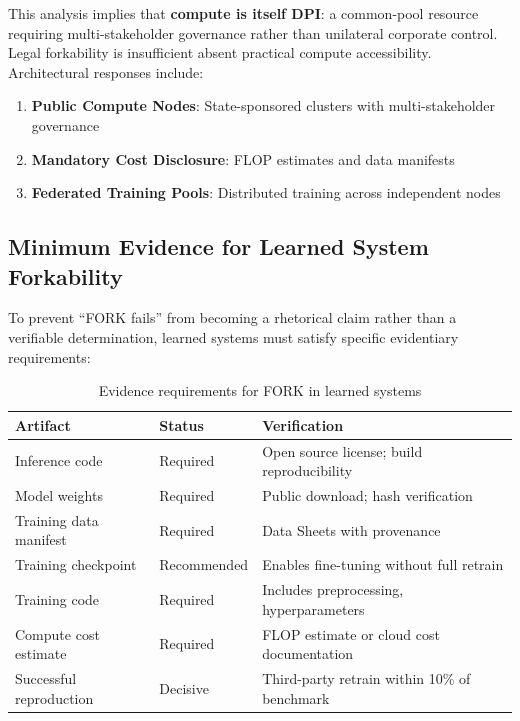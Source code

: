 \documentclass[11pt,a4paper]{article}
\theoremstyle{definition}
\begin{document}
This analysis implies that \textbf{compute is itself DPI}: a common-pool resource requiring multi-stakeholder governance rather than unilateral corporate control. Legal forkability is insufficient absent practical compute accessibility. Architectural responses include:
\begin{enumerate}[noitemsep]
    \item \textbf{Public Compute Nodes}: State-sponsored clusters with multi-stakeholder governance
    \item \textbf{Mandatory Cost Disclosure}: FLOP estimates and data manifests
    \item \textbf{Federated Training Pools}: Distributed training across independent nodes
\end{enumerate}

\subsection{Minimum Evidence for Learned System Forkability}
\label{subsec:fork-evidence}

To prevent ``FORK fails'' from becoming a rhetorical claim rather than a verifiable determination, learned systems must satisfy specific evidentiary requirements:

\begin{table}[htbp]
\centering
\small
\caption{Evidence requirements for FORK in learned systems}
\label{tab:ai-fork-evidence}
\begin{tabular}{@{}llp{5.5cm}@{}}
\toprule
\textbf{Artifact} & \textbf{Status} & \textbf{Verification} \\
\midrule
Inference code & Required & Open source license; build reproducibility \\
Model weights & Required & Public download; hash verification \\
Training data manifest & Required & Data Sheets \citep{gebru2021} with provenance \\
Training checkpoint & Recommended & Enables fine-tuning without full retrain \\
Training code & Required & Includes preprocessing, hyperparameters \\
Compute cost estimate & Required & FLOP estimate or cloud cost documentation \\
Successful reproduction & Decisive & Third-party retrain within 10\% of benchmark \\
\bottomrule
\end{tabular}
\end{table}
\end{document}
